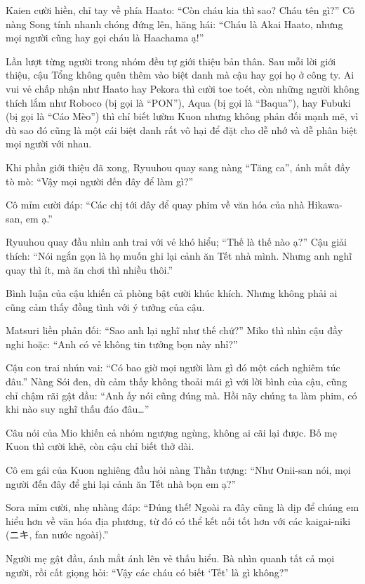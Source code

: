 \documentclass[../main.tex]{subfiles}
\begin{document}
Kaien cười hiền, chỉ tay về phía Haato: ``Còn cháu kia thì sao? Cháu tên gì?'' Cô nàng Song tính nhanh chóng đứng lên, hăng hái: ``Cháu là Akai Haato, nhưng mọi người cũng hay gọi cháu là Haachama ạ!''

Lần lượt từng người trong nhóm đều tự giới thiệu bản thân. Sau mỗi lời giới thiệu, cậu Tổng không quên thêm vào biệt danh mà cậu hay gọi họ ở công ty. Ai vui vẻ chấp nhận như Haato hay Pekora thì cười toe toét, còn những người không thích lắm như Roboco (bị gọi là ``PON''), Aqua (bị gọi là ``Baqua''), hay Fubuki (bị gọi là ``Cáo Mèo'') thì chỉ biết lườm Kuon nhưng không phản đối mạnh mẽ, vì dù sao đó cũng là một cái biệt danh rất vô hại để đặt cho dễ nhớ và dễ phân biệt mọi người với nhau.

Khi phần giới thiệu đã xong, Ryuuhou quay sang nàng ``Tăng ca'', ánh mắt đầy tò mò: ``Vậy mọi người đến đây để làm gì?''

Cô mỉm cười đáp: ``Các chị tới đây để quay phim về văn hóa của nhà Hikawa-san, em ạ.''

Ryuuhou quay đầu nhìn anh trai với vẻ khó hiểu; ``Thế là thế nào ạ?'' Cậu giải thích: ``Nói ngắn gọn là họ muốn ghi lại cảnh ăn Tết nhà mình. Nhưng anh nghĩ quay thì ít, mà ăn chơi thì nhiều thôi.''

Bình luận của cậu khiến cả phòng bật cười khúc khích. Nhưng không phải ai cũng cảm thấy đồng tình với ý tưởng của cậu.

Matsuri liền phản đối: ``Sao anh lại nghĩ như thế chứ?'' Miko thì nhìn cậu  đầy nghi hoặc: ``Anh có vẻ không tin tưởng bọn này nhỉ?''

Cậu con trai nhún vai: ``Có bao giờ mọi người làm gì đó một cách nghiêm túc đâu.'' Nàng Sói đen, dù cảm thấy không thoải mái gì với lời bình của cậu, cũng chỉ chậm rãi gật đầu: ``Anh ấy nói cũng đúng mà. Hồi nãy chúng ta làm phim, có khi nào suy nghĩ thấu đáo đâu\dots''

Câu nói của Mio khiến cả nhóm ngượng ngùng, không ai cãi lại được. Bố mẹ Kuon thì cười khẽ, còn cậu chỉ biết thở dài.

Cô em gái của Kuon nghiêng đầu hỏi nàng Thần tượng: ``Như Onii-san nói, mọi người đến đây để ghi lại cảnh ăn Tết nhà bọn em ạ?''

Sora mỉm cười, nhẹ nhàng đáp: ``Đúng thế! Ngoài ra đây cũng là dịp để chúng em hiểu hơn về văn hóa địa phương, từ đó có thể kết nối tốt hơn với các kaigai-niki (ニキ, fan nước ngoài).''

Người mẹ gật đầu, ánh mắt ánh lên vẻ thấu hiểu. Bà nhìn quanh tất cả mọi người, rồi cất giọng hỏi: ``Vậy các cháu có biết `Tết' là gì không?''
\end{document}
